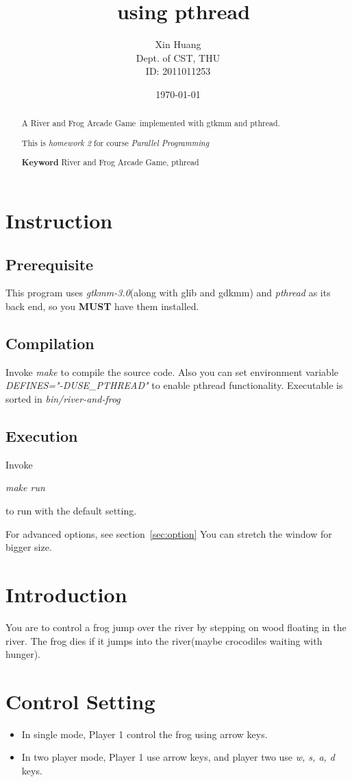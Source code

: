\documentclass{article}
\title{\proj ~using pthread}
\author{Xin Huang\\ Dept. of CST, THU\\ ID: 2011011253}
\date{\today}
\newcommand{\centerize}[1]{\begin{center} #1 \end{center}}
\newcommand{\cmd}[1]{{\it #1}}
\newcommand{\ccmd}[1]{\centerize{\cmd{#1}}}
\newcommand{\proj}{River and Frog Arcade Game}
\begin{document}
\maketitle

\begin{abstract}
	A \proj ~implemented with gtkmm and pthread.

	This is {\it homework 2} for course {\it Parallel Programming}

	{\bf Keyword} \proj, pthread
\end{abstract}

\tableofcontents

\clearpage

\section{Instruction}
	\large
	\subsection{Prerequisite}
	This program uses {\it gtkmm-3.0}(along with glib and gdkmm) and {\it pthread} as its back end, so you {\bf MUST} have
		them installed.
	\subsection{Compilation}
		Invoke \cmd{make} to compile the source code.  Also you can
		set environment variable \cmd{DEFINES="-DUSE\_PTHREAD"} to enable pthread functionality.
		Executable is sorted in \cmd{bin/river-and-frog}
	\subsection{Execution}
		Invoke \ccmd{make run} to run with the default setting.

		For advanced options, see section~\ref{sec:option}
		You can stretch the window for bigger size.

\section{Introduction}
	You are to control a frog jump over the river
	by stepping on wood floating in the river. The frog dies if it jumps into
	the river(maybe crocodiles waiting with hunger).

\section{Control Setting}
	\begin{itemize}
		\item
			In single mode, Player 1 control the frog using arrow keys.
		\item
			In two player mode, Player 1 use arrow keys, and player two use \cmd{w, s, a, d} keys.
	\end{itemize}
\end{document}
